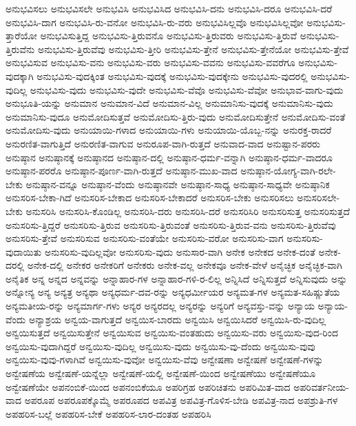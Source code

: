 {ಅನುಭವಿಸಲು
ಅನುಭವಿಸಲೇ
ಅನುಭವಿಸಿ
ಅನುಭವಿಸಿದ
ಅನುಭವಿಸಿ-ದನು
ಅನುಭವಿಸಿ-ದರೂ
ಅನುಭವಿಸಿ-ದರೆ
ಅನುಭವಿಸಿ-ದಾಗ
ಅನುಭವಿಸಿ-ರು-ವನೋ
ಅನುಭವಿಸಿ-ರು-ವರು
ಅನುಭವಿಸಿಲ್ಲವೊ
ಅನುಭವಿಸಿಲ್ಲವೋ
ಅನುಭವಿಸು-ತ್ತಾರೆಯೋ
ಅನುಭವಿಸುತ್ತಿದ್ದ
ಅನುಭವಿಸು-ತ್ತಿರುವನೊ
ಅನುಭವಿಸು-ತ್ತಿರುವರು
ಅನುಭವಿಸು-ತ್ತಿರುವೆ
ಅನುಭವಿಸು-ತ್ತಿರುವೆನು
ಅನುಭವಿಸು-ತ್ತಿರುವೆವು
ಅನುಭವಿಸು-ತ್ತೀರಿ
ಅನುಭವಿಸು-ತ್ತೇನೆ
ಅನುಭವಿಸು-ತ್ತೇನೆಯೋ
ಅನುಭವಿಸು-ತ್ತೇವೆ
ಅನುಭವಿಸುವ
ಅನುಭವಿಸು-ವನು
ಅನುಭವಿಸು-ವರು
ಅನುಭವಿಸು-ವವನು
ಅನುಭವಿಸು-ವವರೆಗೂ
ಅನುಭವಿಸು-ವುದಕ್ಕಾಗಿ
ಅನುಭವಿಸು-ವುದಕ್ಕಿಂತ
ಅನುಭವಿಸು-ವುದಕ್ಕೆ
ಅನುಭವಿಸು-ವುದಕ್ಕೇನು
ಅನುಭವಿಸು-ವುದರಲ್ಲಿ
ಅನುಭವಿಸು-ವುದಿಲ್ಲ
ಅನುಭವಿಸು-ವುದು
ಅನುಭವಿಸು-ವುದೇ
ಅನುಭವಿಸು-ವೆವೊ
ಅನುಭವಿಸು-ವೆವೋ
ಅನುಭಾವ-ವಾಗು-ವುದು
ಅನುಭೂತಿ-ಯನ್ನು
ಅನುಮಾನ
ಅನುಮಾನ-ವಿದೆ
ಅನುಮಾನ-ವಿಲ್ಲ
ಅನುಮಾನಿಸು-ವುದಕ್ಕೆ
ಅನುಮಾನಿಸು-ವುದು
ಅನುಮಾನಿಸು-ವುದೂ
ಅನುಮೋದಿಸುತ್ತವೆ
ಅನುಮೋದಿಸು-ತ್ತಿರು-ವುದು
ಅನುಮೋದಿಸುತ್ತೇನೆ
ಅನುಮೋದಿಸು-ವಂತೆ
ಅನುಮೋದಿಸು-ವುದು
ಅನುಯಾಯಿ-ಗಳಾದ
ಅನುಯಾಯಿ-ಗಳು
ಅನುಯಾಯಿ-ಯೊಬ್ಬ-ನನ್ನು
ಅನುರಕ್ತ-ರಾದರೆ
ಅನುರಣಿತ-ವಾಗುತ್ತಿದೆ
ಅನುರಣಿತ-ವಾಗುವ
ಅನುರೂಪ-ವಾಗಿ-ರುತ್ತದೆ
ಅನುವಾದ-ವಾದ
ಅನುಷ್ಟಾನ-ಪರರು
ಅನುಷ್ಠಾನ
ಅನುಷ್ಠಾನಕ್ಕೆ
ಅನುಷ್ಠಾನದ
ಅನುಷ್ಠಾನ-ದಲ್ಲಿ
ಅನುಷ್ಠಾನ-ಧರ್ಮ-ವನ್ನಾಗಿ
ಅನುಷ್ಠಾನ-ಧರ್ಮ-ವಾದರೂ
ಅನುಷ್ಠಾನ-ಪರರೊ
ಅನುಷ್ಠಾನ-ಪೂರ್ಣ-ವಾಗಿ-ರುತ್ತದೆ
ಅನುಷ್ಠಾನ-ಮುಖ-ವಾದ
ಅನುಷ್ಠಾನ-ಯೋಗ್ಯ-ವಾಗಿ-ರಲೇ-ಬೇಕು
ಅನುಷ್ಠಾನ-ವನ್ನೂ
ಅನುಷ್ಠಾನ-ವೆಂದು
ಅನುಷ್ಠಾನವೇ
ಅನುಷ್ಠಾನ-ಸಾಧ್ಯ
ಅನುಷ್ಠಾನ-ಸಾಧ್ಯವೇ
ಅನುಷ್ಠಾನಿಕ
ಅನುಸರಿಸ-ಬೇಕಾ-ಗಿದೆ
ಅನುಸರಿಸ-ಬೇಕಾದ
ಅನುಸರಿಸ-ಬೇಕಾದರೆ
ಅನುಸರಿಸ-ಬೇಕು
ಅನುಸರಿಸಲು
ಅನುಸರಿಸಲೇ-ಬೇಕು
ಅನುಸರಿಸಿ
ಅನುಸರಿಸಿ-ಕೊಂಡಿಲ್ಲ
ಅನುಸರಿಸಿ-ದರು
ಅನುಸರಿಸಿ-ದರೆ
ಅನುಸರಿಸಿರಿ
ಅನುಸರಿಸುತ್ತ
ಅನುಸರಿಸುತ್ತದೆ
ಅನುಸರಿಸು-ತ್ತಿದ್ದರೆ
ಅನುಸರಿಸು-ತ್ತಿರುವ
ಅನುಸರಿಸು-ತ್ತಿರುವಂತೆ
ಅನುಸರಿಸು-ತ್ತಿರುವ-ವನು
ಅನುಸರಿಸು-ತ್ತಿರುವೆವು
ಅನುಸರಿಸು-ತ್ತೇವೆ
ಅನುಸರಿಸುವ
ಅನುಸರಿಸು-ವಂತೆಯೇ
ಅನುಸರಿಸು-ವರೋ
ಅನುಸರಿಸು-ವಾಗ
ಅನುಸರಿಸು-ವುದಾಯಿತು
ಅನುಸರಿಸು-ವುದಿಲ್ಲವೋ
ಅನುಸರಿಸು-ವುದು
ಅನುಸಾರ-ವಾಗಿ
ಅನೇಕ
ಅನೇಕದ
ಅನೇಕ-ದಂತೆ
ಅನೇಕ-ದರಲ್ಲಿ
ಅನೇಕ-ದಲ್ಲಿ
ಅನೇಕರ
ಅನೇಕರಿಗೆ
ಅನೇಕರು
ಅನೇಕ-ವಲ್ಲ
ಅನೇಕವೂ
ಅನೇಕ-ವೇಳೆ
ಅನೈಚ್ಛಿಕ
ಅನೈಚ್ಛಿಕ-ವಾಗಿ
ಅನೈತಿಕ
ಅನ್ನ
ಅನ್ನದ
ಅನ್ನವನ್ನು
ಅನ್ನಾಹಾರ-ಗಳ
ಅನ್ನಾಹಾರ-ಗಳಿ-ರ-ಲಿಲ್ಲ
ಅನ್ನಿಸಿದೆ
ಅನ್ನಿಸುತ್ತದೆ
ಅನ್ನಿಸುವುದು
ಅನ್ನು
ಅನ್ನೋನ್ಯ
ಅನ್ಯ
ಅನ್ಯತ್ರ
ಅನ್ಯಥಾ
ಅನ್ಯಧರ್ಮ-ದವ-ರನ್ನು
ಅನ್ಯಧರ್ಮೀಯರ
ಅನ್ಯಮತ-ಗಳ
ಅನ್ಯಮತ-ಸಹಿಷ್ಣುತೆಯ
ಅನ್ಯಮತೀಯ-ರನ್ನು
ಅನ್ಯಮಾರ್ಗ-ಗಳು
ಅನ್ಯರ
ಅನ್ಯರದಲ್ಲ
ಅನ್ಯರನ್ನು
ಅನ್ಯರಿಗೆ
ಅನ್ಯವಸ್ತು-ವನ್ನು
ಅನ್ಯಾಯ
ಅನ್ಯಾಯ-ವೆಂದು
ಅನ್ಯಾಶ್ರಯ
ಅನ್ವಯ-ವಾಗುತ್ತದೆ
ಅನ್ವಯಿಸ-ಬಾರದು
ಅನ್ವಯಿಸಿ
ಅನ್ವಯಿಸಿದರೆ
ಅನ್ವಯಿಸಿ-ರು-ವುದಿಲ್ಲ
ಅನ್ವಯಿಸುತ್ತದೆ
ಅನ್ವಯಿಸುತ್ತೇನೆ
ಅನ್ವಯಿಸುವ
ಅನ್ವಯಿಸು-ವಂತಹುದು
ಅನ್ವಯಿಸು-ವರು
ಅನ್ವಯಿಸು-ವುದ-ರಿಂದ
ಅನ್ವಯಿಸು-ವುದಾಗಿದ್ದರೆ
ಅನ್ವಯಿಸು-ವುದಿಲ್ಲ
ಅನ್ವಯಿಸು-ವುದು
ಅನ್ವಯಿಸು-ವು-ದೆಂದು
ಅನ್ವಯಿಸು-ವುವು
ಅನ್ವಯಿಸು-ವುವು-ಗಳಾಗಿವೆ
ಅನ್ವಯಿಸು-ವುವೋ
ಅನ್ವಯಿಸು-ವೆವು
ಅನ್ವೇಷಣಾ
ಅನ್ವೇಷಣೆ
ಅನ್ವೇಷಣೆ-ಗಳನ್ನು
ಅನ್ವೇಷಣೆಯ
ಅನ್ವೇಷಣೆ-ಯನ್ನೆಲ್ಲಾ
ಅನ್ವೇಷಣೆ-ಯಲ್ಲಿ
ಅನ್ವೇಷಣೆ-ಯಿಂದ
ಅನ್ವೇಷಣೆಯು
ಅನ್ವೇಷಣೆಯೂ
ಅನ್ವೇಷಣೆಯೇ
ಅಪನಂಬಿಕೆ-ಯಿಂದ
ಅಪನಂಬಿಕೆಯೂ
ಅಪರಿಗ್ರಹ
ಅಪರಿಚಿತನು
ಅಪರಿಮಿತ-ವಾದ
ಅಪರಿವರ್ತನೀಯ-ವಾದ
ಅಪರೂಪ
ಅಪರೂಪಕ್ಕೊಮ್ಮೆ
ಅಪರೂಪದ
ಅಪವಿತ್ರ
ಅಪವಿತ್ರ-ಗೊಳಿಸ-ಬೇಡಿ
ಅಪವಿತ್ರ-ನಾದ
ಅಪಶ್ರುತಿ-ಗಳ
ಅಪಹರಿಸ-ಬಲ್ಲೆ
ಅಪಹರಿಸ-ಬೇಕೆ
ಅಪಹರಿಸ-ಲಾರ-ದಂತಹ
ಅಪಹರಿಸಿ
}
